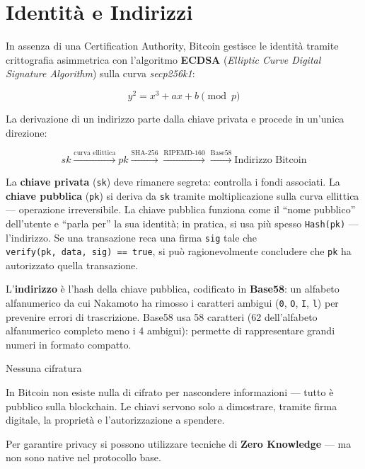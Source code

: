 \documentclass[
  italian,
  openany]{book}
\begin{document}
\section{Identità e Indirizzi}\label{identituxe0-e-indirizzi}

In assenza di una Certification Authority, Bitcoin gestisce le identità
tramite crittografia asimmetrica con l'algoritmo \textbf{ECDSA}
(\emph{Elliptic Curve Digital Signature Algorithm}) sulla curva
\emph{secp256k1}:

\[y^2 = x^3 + ax + b \pmod{p}\]

La derivazione di un indirizzo parte dalla chiave privata e procede in
un'unica direzione:

\[sk \xrightarrow{\text{curva ellittica}} pk \xrightarrow{\text{SHA-256}} \xrightarrow{\text{RIPEMD-160}} \xrightarrow{\text{Base58}} \text{Indirizzo Bitcoin}\]

La \textbf{chiave privata} (\texttt{sk}) deve rimanere segreta:
controlla i fondi associati. La \textbf{chiave pubblica} (\texttt{pk})
si deriva da \texttt{sk} tramite moltiplicazione sulla curva ellittica
--- operazione irreversibile. La chiave pubblica funziona come il ``nome
pubblico'' dell'utente e ``parla per'' la sua identità; in pratica, si
usa più spesso \texttt{Hash(pk)} --- l'indirizzo. Se una transazione
reca una firma \texttt{sig} tale che
\texttt{verify(pk,\ data,\ sig)\ ==\ true}, si può ragionevolmente
concludere che \texttt{pk} ha autorizzato quella transazione.

L'\textbf{indirizzo} è l'hash della chiave pubblica, codificato in
\textbf{Base58}: un alfabeto alfanumerico da cui Nakamoto ha rimosso i
caratteri ambigui (\texttt{0}, \texttt{O}, \texttt{I}, \texttt{l}) per
prevenire errori di trascrizione. Base58 usa 58 caratteri (62
dell'alfabeto alfanumerico completo meno i 4 ambigui): permette di
rappresentare grandi numeri in formato compatto.

\begin{calloutnote}{Nessuna cifratura}

In Bitcoin non esiste nulla di cifrato per nascondere informazioni ---
tutto è pubblico sulla blockchain. Le chiavi servono solo a dimostrare,
tramite firma digitale, la proprietà e l'autorizzazione a spendere.

Per garantire privacy si possono utilizzare tecniche di \textbf{Zero
Knowledge} --- ma non sono native nel protocollo base.

\end{calloutnote}
\end{document}
